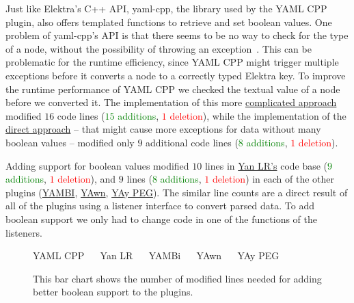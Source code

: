 Just like Elektra’s C++ API, yaml-cpp, the library used by the YAML CPP plugin, also offers templated functions to retrieve and set boolean values. One problem of yaml-cpp’s API is that there seems to be no way to check for the type of a  node, without the possibility of throwing an exception~\cite{beder2013type}. This can be problematic for the runtime efficiency, since YAML CPP might trigger multiple exceptions before it converts a  node to a correctly typed Elektra key. To improve the runtime performance of YAML CPP we checked the textual value of a  node before we converted it. The implementation of this more \href{https://github.com/ElektraInitiative/libelektra/commit/d4e62eebd006ea4b066c75e6e885ee5a4b6e26cf#diff-4bdb640234f370e3a9db751e1f7d769b}{complicated approach} modified $16$ code lines (\textcolor{Green}{$15$ additions}, \textcolor{Red}{$1$ deletion}), while the implementation of the \href{https://github.com/ElektraInitiative/libelektra/commit/1e9a07baad8a140c6eda654053db450c0901f5d0#diff-4bdb640234f370e3a9db751e1f7d769b}{direct approach} – that might cause more exceptions for data without many boolean values – modified only $9$ additional code lines (\textcolor{Green}{$8$ additions}, \textcolor{Red}{$1$ deletion}).

Adding support for boolean values modified $10$ lines in \href{https://issues.libelektra.org/2653}{Yan LR’s} code base (\textcolor{Green}{$9$ additions}, \textcolor{Red}{$1$ deletion}), and $9$ lines (\textcolor{Green}{$8$ additions}, \textcolor{Red}{$1$ deletion}) in each of the other plugins (\href{https://issues.libelektra.org/2652}{YAMBI}, \href{https://issues.libelektra.org/2651}{YAwn}, \href{https://issues.libelektra.org/2654}{YAy PEG}). The similar line counts are a direct result of all of the plugins using a listener interface to convert parsed  data. To add boolean support we only had to change code in one of the functions of the listeners.

\begin{figure}[H]
  \begin{bchart}[max=20, width=0.8\textwidth, unit={~Lines of Code}]
  \end{bchart}
  \begin{center}
  \vspace{-0.5cm}
     YAML CPP ~~
     Yan LR ~~
     YAMBi ~~
     YAwn ~~
     YAy PEG
  \vspace{-0.5cm}
  \end{center}
  \caption{This bar chart shows the number of modified lines needed for adding better boolean support to the  plugins.}
  \label{fig:boolean_line_count}
\end{figure}

